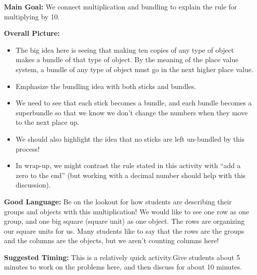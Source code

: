 \documentclass[nooutcomes,noauthor,handout]{ximera}
\begin{document}
\begin{instructorNotes}

{\bf Main Goal:} We connect multiplication and bundling to explain the rule for multiplying by 10.

{\bf Overall Picture:}
\begin{itemize}
	\item The big idea here is seeing that making ten copies of any type of object makes a bundle of that type of object. By the meaning of the place value system, a bundle of any type of object must go in the next higher place value.
	\item Emphasize the bundling idea with both sticks and bundles.
	\item We need to see that each stick becomes a bundle, and each bundle becomes a superbundle so that we know we don't change the numbers when they move to the next place up.
	\item We should also highlight the idea that no sticks are left un-bundled by this process!
	\item  In wrap-up, we might contrast the rule stated in this activity with  ``add a zero to the end'' (but working with a decimal number should help with this discussion). 
\end{itemize}

{\bf Good Language:} Be on the lookout for how students are describing their groups and objects with this multiplication! We would like to see one row as one group, and one big square (square unit) as one object. The rows are organizing our square units for us. Many students like to say that the rows are the groups and the columns are the objects, but we aren't counting columns here!

{\bf Suggested Timing:} This is a relatively quick activity.Give students about 5 minutes to work on the problems here, and then discuss for about 10 minutes.



\end{instructorNotes}
\end{document}
